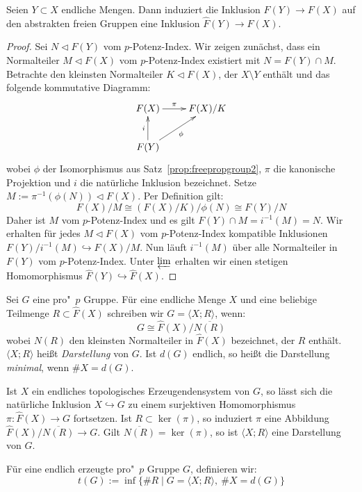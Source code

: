 \documentclass[11pt,a4paper,openany]{memoir}
\begin{document}
\begin{proposition}\label{prop:freepropgroup3}
Seien $Y\subset X$ endliche Mengen. Dann induziert die Inklusion $F(Y)\to F(X)$ auf den abstrakten freien Gruppen eine Inklusion $\widehat{F}(Y)\to\widehat{F}(X)$.
\end{proposition}

\begin{proof}
Sei $N\lhd F(Y)$ vom $p$-Potenz-Index. Wir zeigen zunächst, dass ein Normalteiler $M\lhd F(X)$ vom $p$-Potenz-Index existiert mit $N=F(Y)\cap M$. Betrachte den kleinsten Normalteiler $K\lhd F(X)$, der $X\setminus Y$ enthält und das folgende kommutative Diagramm:
\[\xymatrix{
F(X) \ar[r]^-\pi & F(X)/K\\
F(Y) \ar[u]^i \ar[ru]_\phi
} \]
wobei $\phi$ der Isomorphismus aus Satz~\ref{prop:freepropgroup2}, $\pi$ die kanonische Projektion und $i$ die natürliche Inklusion bezeichnet. Setze $M:= \pi^{-1}(\phi(N))\lhd F(X)$. Per Definition gilt: 
\[F(X)/M\cong (F(X)/K)/\phi(N)\cong F(Y)/N\]
Daher ist $M$ vom $p$-Potenz-Index und es gilt $F(Y)\cap M = i^{-1}(M) = N$. Wir erhalten für jedes $M\lhd F(X)$ vom $p$-Potenz-Index kompatible Inklusionen $F(Y)/i^{-1}(M)\hookrightarrow F(X)/M$. Nun läuft $i^{-1}(M)$ über alle Normalteiler in $F(Y)$ vom $p$-Potenz-Index. Unter $\varprojlim$ erhalten wir einen stetigen Homomorphismus $\widehat{F}(Y)\hookrightarrow\widehat{F}(X)$.
\end{proof}
\fi

\begin{definition}
Sei $G$ eine pro"~$p$ Gruppe. Für eine endliche Menge $X$ und eine beliebige Teilmenge $R\subset \widehat{F}(X)$ schreiben wir $G=\langle X;R\rangle$, wenn:
\[G \cong \widehat{F}(X)/\overline{N(R) } \]
wobei $N(R)$ den kleinsten Normalteiler in $\widehat{F}(X)$ bezeichnet, der $R$ enthält. $\langle X;R\rangle$ heißt \textit{Darstellung} von $G$. Ist $d(G)$ endlich, so heißt die Darstellung \textit{minimal}, wenn $\#X=d(G)$.

Ist $X$ ein endliches topologisches Erzeugendensystem von $G$, so lässt sich die natürliche Inklusion $X\hookrightarrow G$ zu einem surjektiven Homomorphismus $\pi:\widehat{F}(X)\to G$ fortsetzen. Ist $R\subset \ker(\pi)$, so induziert $\pi$ eine Abbildung $\widehat{F}(X)/\overline{N(R) }\to G$. Gilt $\overline{N(R)}=\ker(\pi)$, so ist $\langle X;R\rangle$ eine Darstellung von $G$.
\end{definition}

\begin{definition}
Für eine endlich erzeugte pro"~$p$ Gruppe $G$, definieren wir:
\[t(G):=\inf\{ \#R \mid G= \langle X;R\rangle,\ \#X = d(G) \} \]
\end{definition}
\end{document}
